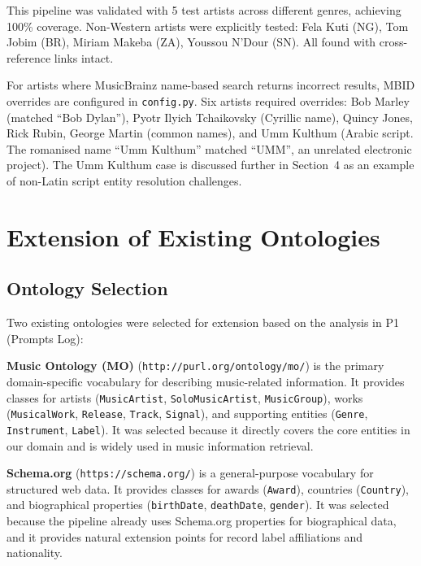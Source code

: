 \documentclass[11pt,a4paper]{article}
\begin{document}
This pipeline was validated with 5 test artists across different genres, achieving 100\% coverage. Non-Western artists were explicitly tested: Fela Kuti (NG), Tom Jobim (BR), Miriam Makeba (ZA), Youssou N'Dour (SN). All found with cross-reference links intact.

For artists where MusicBrainz name-based search returns incorrect results, MBID overrides are configured in \texttt{config.py}. Six artists required overrides: Bob Marley (matched ``Bob Dylan''), Pyotr Ilyich Tchaikovsky (Cyrillic name), Quincy Jones, Rick Rubin, George Martin (common names), and Umm Kulthum (Arabic script. The romanised name ``Umm Kulthum'' matched ``UMM'', an unrelated electronic project). The Umm Kulthum case is discussed further in Section~4 as an example of non-Latin script entity resolution challenges.

\section{Extension of Existing Ontologies}

\subsection{Ontology Selection}

Two existing ontologies were selected for extension based on the analysis in P1 (Prompts Log):

\textbf{Music Ontology (MO)} (\texttt{http://purl.org/ontology/mo/}) is the primary domain-specific vocabulary for describing music-related information. It provides classes for artists (\texttt{MusicArtist}, \texttt{SoloMusicArtist}, \texttt{MusicGroup}), works (\texttt{MusicalWork}, \texttt{Release}, \texttt{Track}, \texttt{Signal}), and supporting entities (\texttt{Genre}, \texttt{Instrument}, \texttt{Label}). It was selected because it directly covers the core entities in our domain and is widely used in music information retrieval.

\textbf{Schema.org} (\texttt{https://schema.org/}) is a general-purpose vocabulary for structured web data. It provides classes for awards (\texttt{Award}), countries (\texttt{Country}), and biographical properties (\texttt{birthDate}, \texttt{deathDate}, \texttt{gender}). It was selected because the pipeline already uses Schema.org properties for biographical data, and it provides natural extension points for record label affiliations and nationality.
\end{document}
